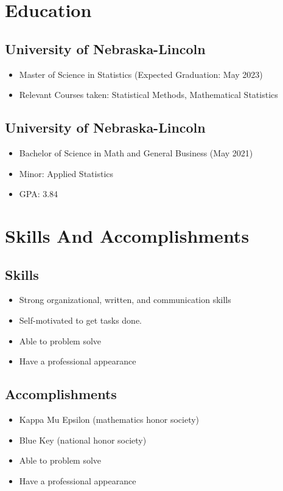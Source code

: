 	\section{Education}
	  \subsection{University of Nebraska-Lincoln}
	      \begin{itemize}
				  \item Master of Science in Statistics (Expected Graduation: May 2023)
				  \item Relevant Courses taken: Statistical Methods, Mathematical Statistics
				\end{itemize}
		\subsection{University of Nebraska-Lincoln}
				\begin{itemize}
				  \item Bachelor of Science in Math and General Business (May 2021)
				  \item Minor: Applied Statistics
				  \item GPA: 3.84
			  \end{itemize}


\section{Skills And Accomplishments}
	  \subsection{Skills}
	      \begin{itemize}
				  \item Strong organizational, written, and communication skills
				  \item Self-motivated to get tasks done.
				  \item Able to problem solve
				  \item Have a professional appearance
				  \end{itemize}

				   \subsection{Accomplishments}
	      \begin{itemize}
				  \item Kappa Mu Epsilon (mathematics honor society)
				  \item Blue Key (national honor society)
				  \item Able to problem solve
				  \item Have a professional appearance
				  \end{itemize}


